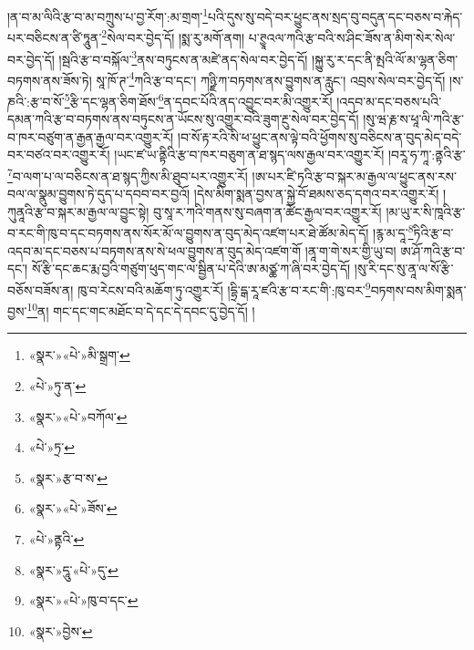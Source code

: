།ན་བ་མ་ལིའི་རྩ་བ་མ་བཀྲུས་པ་བྱ་རོག་:མ་གྲག་\footnote{«སྣར་»«པེ་»མི་སྒྲག་}པའི་དུས་སུ་བདེ་བར་ཕྱུང་ནས་སྲད་བུ་བདུན་དང་བཅས་བ་རྐེད་པར་བཅིངས་ན་ཙི་ཏཱུན་\footnote{«པེ་»ཏུ་ན་}སེལ་བར་བྱེད་དོ། །སྨ་རུ་མགོ་ནག། པ་ཊྱཱའལ་ཀའི་རྩ་བའི་ས་ཤིང་ཟོས་ན་མིག་སེར་སེལ་བར་བྱེད་དོ། །སྦའི་རྩ་བ་བསྐོལ་\footnote{«སྣར་»«པེ་»བཀོལ་}ནས་བཏུངས་ན་མཛེ་ནད་སེལ་བར་བྱེད་དོ། །སྐྱུ་རུ་ར་དང་ནི་མྤའི་ལོ་མ་ལྷན་ཅིག་བཏགས་ནས་ཟོས་ཏེ། སཱ་ཁོ་ཊ་\footnote{«པེ་»ཏྲ་}ཀའི་རྩ་བ་དང་། ཀཉྫི་ཀ་བཏགས་ནས་བྱུགས་ན་རླུང་། འབྲས་སེལ་བར་བྱེད་དོ། །ས་ཎའི་:རྩ་བ་སོ་\footnote{«སྣར་»རྩ་བ་ས་}རྩི་དང་ལྷན་ཅིག་ཐོས་\footnote{«སྣར་»«པེ་»ཟོས་}ན་དབང་པོའི་ནད་འབྱུང་བར་མི་འགྱུར་རོ། །འདབ་མ་དང་བཅས་པའི་དམན་ཀའི་རྩ་བ་བཏགས་ནས་བཏུངས་ན་ཡོངས་སུ་འགྱུར་བའི་ཟུག་རྔུ་སེལ་བར་བྱེད་དོ། །སུ་ཝ་རྞ་ས་ཕཱ་ལི་ཀའི་རྩ་བ་ཁར་བཙུག་ན་རྒྱན་རྒྱལ་བར་འགྱུར་རོ། །བ་སོ་རྟ་རའི་སི་ཕ་ཕྱུང་ནས་ལྟེ་བའི་ཕྱོགས་སུ་བཅིངས་ན་བུད་མེད་བདེ་བར་བཙའ་བར་འགྱུར་རོ། །ཡང་ཛ་ཡ་ནྟིའི་རྩ་བ་ཁར་བཅུག་ན་ཐ་སྙད་ལས་རྒྱལ་བར་འགྱུར་རོ། །བརཱ་ཧ་ཀཱ་:ནྟའི་རྩ་\footnote{«པེ་»ནྟའི་}བ་ལག་པ་ལ་བཅིངས་ན་ཐ་སྙད་ཀྱིས་མི་ཐུབ་པར་འགྱུར་རོ། །ཨ་པར་ཛི་ཏའི་རྩ་བ་སྐར་མ་རྒྱལ་ལ་ཕྱུང་ནས་རས་བལ་ལ་སྣུམ་བྱུགས་ཏེ་དུད་པ་དབབ་བར་བྱའོ། །དེས་མིག་སྨན་བྱས་ན་སྐྱེ་བོ་ཐམས་ཅད་དགའ་བར་འགྱུར་རོ། །ཀུནཱའི་རྩ་བ་སྐར་མ་རྒྱལ་ལ་བྱུང་སྟེ། བུ་སཱ་ར་ཀའི་གནས་སུ་བཞག་ན་ཚོང་རྒྱལ་བར་འགྱུར་རོ། །མ་ཡུ་ར་སི་ཁཱའི་རྩ་བ་རང་གི་ཁུ་བ་དང་བཏགས་ནས་སོར་མོ་ལ་བྱུགས་ན་བུད་མེད་འཛག་པར་ཐེ་ཚོམ་མེད་དོ། །རྙ་མ་དཱ་\footnote{«སྣར་»དཱུ་«པེ་»དུ་}ཏིའི་རྩ་བ་འདབ་མ་དང་བཅས་པ་བཏགས་ནས་སེ་ཕལ་བྱུགས་ན་བུད་མེད་འཛག་གོ །ནཱ་ག་གེ་སར་གྱི་ཡུ་བ། ཨ་ཤོ་ཀའི་རྩ་བ་དང་། སོ་རྩི་དང་ཆང་རྨ་བྱའི་གཙུག་ཕུད་གང་ལ་སྦྱིན་པ་དེའི་ཨ་མཙྪ་ཀ་ཞི་བར་བྱེད་དོ། །སུ་རི་དང་སུ་ནཱ་ལ་སོ་རྩི་བཅོས་བཟོས་ན། ཁུ་བ་རེངས་བའི་མཆོག་ཏུ་འགྱུར་རོ། །དྷྲི་དྒ་རཱ་ཛའི་རྩ་བ་རང་གི་:ཁུ་བར་\footnote{«སྣར་»«པེ་»ཁུ་བ་དང་}བཏགས་བས་མིག་སྨན་བྱས་\footnote{«སྣར་»བྱེས་}ན། གང་དང་གང་མཐོང་བ་དེ་དང་དེ་དབང་དུ་བྱེད་དོ། །
